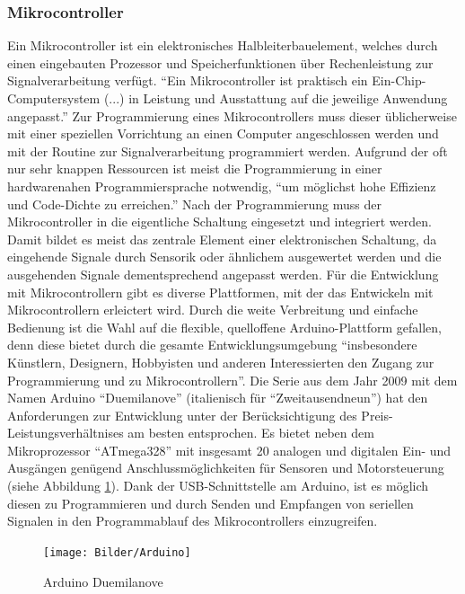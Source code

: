 \documentclass[a4paper, 12pt, bibtotocnumbered, liststotocnumbered]{scrartcl}
\begin{document}
	\subsubsection{Mikrocontroller}
	Ein Mikrocontroller ist ein elektronisches Halbleiterbauelement, welches durch einen eingebauten Prozessor und Speicherfunktionen über Rechenleistung zur Signalverarbeitung verfügt. “Ein Mikrocontroller ist praktisch ein Ein-Chip-Computersystem (...) in Leistung und Ausstattung auf die jeweilige Anwendung angepasst.”\cite{wikipedia-mikrocontroller}
	Zur Programmierung eines Mikrocontrollers muss dieser üblicherweise mit einer speziellen Vorrichtung an einen Computer angeschlossen werden und mit der Routine zur Signalverarbeitung programmiert werden. Aufgrund der oft nur sehr knappen Ressourcen ist meist die Programmierung in einer hardwarenahen Programmiersprache notwendig, “um möglichst hohe Effizienz und Code-Dichte zu erreichen.”\cite{wikipedia-mikrocontroller} Nach der Programmierung muss der Mikrocontroller in die eigentliche Schaltung eingesetzt und integriert werden. Damit bildet es meist das zentrale Element einer elektronischen Schaltung, da eingehende Signale durch Sensorik oder ähnlichem ausgewertet werden und die ausgehenden Signale dementsprechend angepasst werden.
	Für die Entwicklung mit Mikrocontrollern gibt es diverse Plattformen, mit der das Entwickeln mit Mikrocontrollern erleictert wird. Durch die weite Verbreitung und einfache Bedienung ist die Wahl auf die flexible, quelloffene Arduino-Plattform gefallen, denn diese bietet durch die gesamte Entwicklungsumgebung “insbesondere Künstlern, Designern, Hobbyisten und anderen Interessierten den Zugang zur Programmierung und zu Mikrocontrollern”.
	Die Serie aus dem Jahr 2009 mit dem Namen Arduino “Duemilanove” (italienisch für “Zweitausendneun”) hat den Anforderungen zur Entwicklung unter der Berücksichtigung des Preis-Leistungsverhältnises am besten entsprochen. Es bietet neben dem Mikroprozessor “ATmega328” mit insgesamt 20 analogen und digitalen Ein- und Ausgängen genügend Anschlussmöglichkeiten für Sensoren und Motorsteuerung (siehe Abbildung \ref{Arduino}).
	Dank der USB-Schnittstelle am Arduino, ist es möglich diesen zu Programmieren und durch Senden und Empfangen von seriellen Signalen in den Programmablauf des Mikrocontrollers einzugreifen.

	\begin{figure}[htb]
		\centering
		\texttt{[image: Bilder/Arduino]}
		\caption{Arduino Duemilanove}
		\label{Arduino}
	\end{figure}
\end{document}
